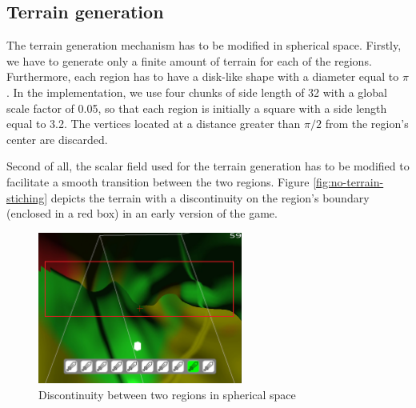\subsection{Terrain generation}
The terrain generation mechanism has to be modified in spherical space.
Firstly, we have to generate only a finite amount of terrain for each of the regions.
Furthermore, each region has to have a disk-like shape with a diameter equal to $\pi$.
In the implementation, we use four chunks of side length of 32 with a global scale factor of 0.05, so that each region is initially a square with a side length equal to 3.2.
The vertices located at a distance greater than $\pi/2$ from the region's center are discarded.

Second of all, the scalar field used for the terrain generation has to be modified to facilitate a smooth transition between the two regions.
Figure \autoref{fig:no-terrain-stiching} depicts the terrain with a discontinuity on the region's boundary (enclosed in a red box) in an early version of the game.
\begin{figure}[!htb]
    \centering
    \includegraphics[width=0.6\textwidth]{chapters/problems/resources/no-terrain-stiching.png}
    \caption{Discontinuity between two regions in spherical space}
    \label{fig:no-terrain-stiching}
\end{figure}

